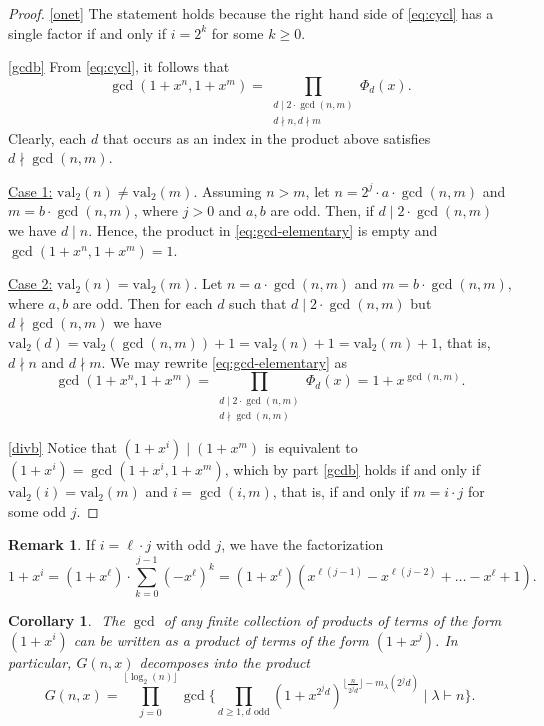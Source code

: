 \documentclass[reqno]{amsart}
\def\G{G}
\def\val{\mathrm{val}}
\newtheorem{corollary}[theorem]{Corollary}
\theoremstyle{definition}
\newtheorem{remark}{Remark}
\begin{document}
\begin{proof}



\ref{onet} The statement holds because the right hand side of \eqref{eq:cycl} has a single factor if and only if $i=2^k$ for some $k\geq 0$.

 \ref{gcdb} From \eqref{eq:cycl}, it follows that
 \begin{equation}\label{eq:gcd-elementary}\gcd(1+x^n,1+x^m)=\prod_{\substack{d\mid 2\cdot\gcd(n,m)\\ d\nmid n, d\nmid m}}\Phi_d(x).\end{equation}
 Clearly,
 each  $d$  that occurs as an index in the product above satisfies $d\nmid\gcd(n,m)$.
 
 \noindent 
 \underline{Case 1:} $\val_2(n)\neq \val_2(m)$. Assuming $n>m$, let $n=2^j\cdot a\cdot \gcd(n,m)$ and $m=b\cdot \gcd(n,m) $, where $j> 0$ and $a,b$ are odd. Then,  if  $d\mid 2\cdot\gcd(n,m)$ we have $d\mid n$. Hence, the product in \eqref{eq:gcd-elementary} is empty and $\gcd(1+x^n,1+x^m)=1$.
 
  \noindent 
 \underline{Case 2:}  $\val_2(n)=\val_2(m)$. Let $n= a\cdot \gcd(n,m)$ and $m=b\cdot \gcd(n,m) $, where $a,b$ are odd. Then for each $d$ such that $d\mid 2\cdot\gcd(n,m)$ but $d\nmid\gcd(n,m)$ we have $\val_2(d)=\val_2(\gcd(n,m))+1=\val_2(n)+1=\val_2(m)+1$, that is, $d\nmid n$ and $d\nmid m$. We may rewrite \eqref{eq:gcd-elementary} as
 \[\gcd(1+x^n,1+x^m)=\prod_{\substack{d\mid 2\cdot\gcd(n,m)\\ d\nmid \gcd(n,m)}}\Phi_d(x)=1+x^{\gcd(n,m)}.\]


 \ref{divb} Notice that $(1+x^i)\mid(1+x^m)$ is equivalent to $(1+x^i)=\gcd(1+x^i,1+x^m)$, which by part \ref{gcdb} holds if and only if $\val_2(i)=\val_2(m)$ and $i=\gcd(i,m)$, that is, if and only if $m=i\cdot j$ for some odd $j$.
\end{proof}
\begin{remark}
If  $i=\ell\cdot j$ with odd $j$, we have the factorization
\[1+x^i=(1+x^\ell)\cdot\sum_{k=0}^{j-1}(-x^\ell)^{k}=(1+x^\ell)(x^{\ell(j-1)}-x^{\ell(j-2)}+\ldots-x^\ell+1).\]
\end{remark}
\begin{corollary}\label{cor:on_gcd_hlambda} $ $
 The $\gcd$ of any finite collection of products of terms of the form $(1+x^i)$ can be written as a product of terms of the form $(1+x^j)$.
    In particular, $\G(n,x)$ decomposes into the product $$\G(n,x)=\prod_{j=0}^{\lfloor\log_2(n)\rfloor}\gcd\{ \prod_{d \geq 1, d\textrm{ odd}}(1+x^{2^jd})^{\lfloor \frac{n}{2^jd}\rfloor-m_\lambda(2^jd)}\mid \lambda\vdash n\}. $$
  \end{corollary}
\end{document}

